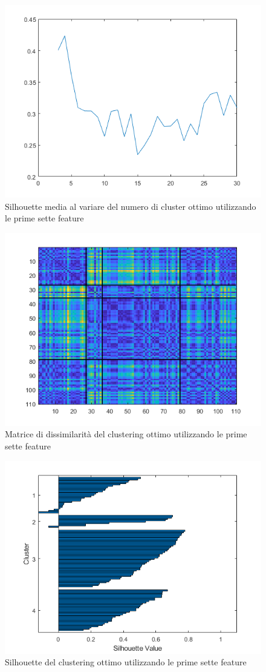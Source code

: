 \documentclass[a4paper,12pt,openany,oneside]{book}
\begin{document}
\begin{figure}[H]
	\centering
	\includegraphics[width=0.8\linewidth]{pics/1to7/chooseK.png}
	\caption{Silhouette media al variare del numero di cluster ottimo utilizzando le prime sette feature}
	\label{fig:chooseK_1}
\end{figure}
\begin{figure}[H]
	\centering
	\includegraphics[width=0.8\linewidth]{pics/1to7/diss_mat.png}
	\caption{Matrice di dissimilarità del clustering ottimo utilizzando le prime sette feature}
	\label{fig:diss-mat_1}
\end{figure}
\begin{figure}[H]
	\includegraphics[width=\linewidth]{pics/1to7/silhouette.png}
	\caption{Silhouette del clustering ottimo utilizzando le prime sette feature}
	\label{fig:silhouette_1}
\end{figure}
\end{document}

